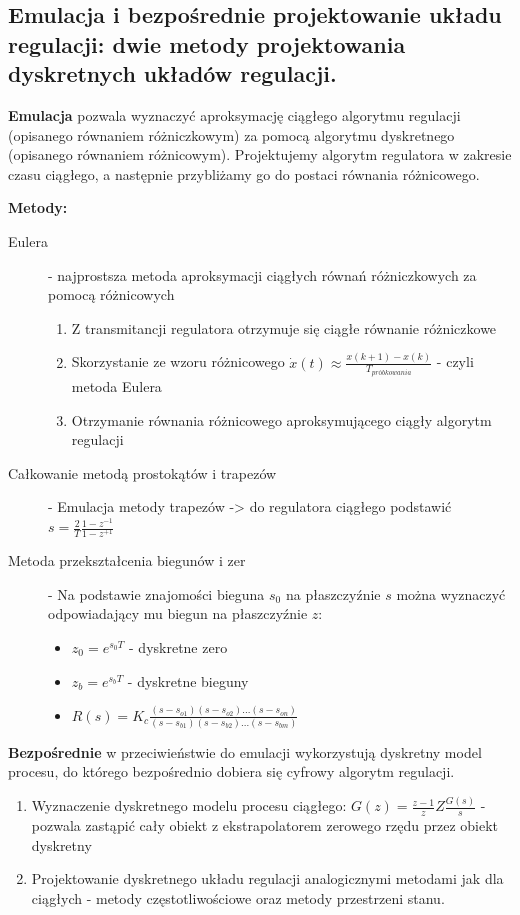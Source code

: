 \subsection{Emulacja i bezpośrednie projektowanie układu regulacji: dwie metody projektowania dyskretnych układów regulacji.}
\textbf{Emulacja} pozwala wyznaczyć aproksymację ciągłego algorytmu regulacji (opisanego równaniem różniczkowym) za pomocą algorytmu dyskretnego (opisanego równaniem różnicowym). Projektujemy algorytm regulatora w zakresie czasu ciągłego, a następnie przybliżamy go do postaci równania różnicowego.

\textbf{Metody:}
\begin{description}
    \item[Eulera] - najprostsza metoda aproksymacji ciągłych równań różniczkowych za pomocą różnicowych\mbox{}
    \begin{enumerate}
        \item Z transmitancji regulatora otrzymuje się ciągłe równanie różniczkowe
        \item Skorzystanie ze wzoru różnicowego $\dot{x}(t) \approx \frac{x(k+1)-x(k)}{T_{próbkowania}}$ - czyli metoda Eulera
        \item Otrzymanie równania różnicowego aproksymującego ciągły algorytm regulacji
    \end{enumerate}
    \item[Całkowanie metodą prostokątów i trapezów] - Emulacja metody trapezów -> do regulatora ciągłego podstawić $s = \frac{2}{T}\frac{1-z^{-1}}{1-z^{+1}}$
    \item[Metoda przekształcenia biegunów i zer] - Na podstawie znajomości bieguna $s_0$ na płaszczyźnie $s$ można wyznaczyć odpowiadający mu biegun na płaszczyźnie $z$:\mbox{}
    \begin{itemize}
        \item $z_0 = e^{s_0T}$ - dyskretne zero
        \item $z_b = e^{s_bT}$ - dyskretne bieguny
        \item $R(s) = K_c\frac{(s-s_{o1})(s-s_{o2})...(s-s_{on})}{(s-s_{b1})(s-s_{b2})...(s-s_{bm})}$
    \end{itemize}
\end{description}


\textbf{Bezpośrednie} w przeciwieństwie do emulacji wykorzystują dyskretny model procesu, do którego bezpośrednio dobiera się cyfrowy algorytm regulacji.

\begin{enumerate}
    \item Wyznaczenie dyskretnego modelu procesu ciągłego: $G(z) = \frac{z-1}{z}Z\frac{G(s)}{s}$ - pozwala zastąpić cały obiekt z ekstrapolatorem zerowego rzędu przez obiekt dyskretny
    \item Projektowanie dyskretnego układu regulacji analogicznymi metodami jak dla ciągłych - metody częstotliwościowe oraz metody przestrzeni stanu.
\end{enumerate}


